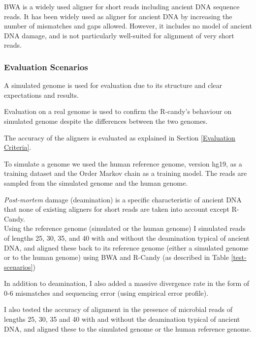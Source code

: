 \documentclass[11pt,a4paper]{report}
\begin{document}
BWA is a widely used aligner for short reads including ancient
DNA sequence reads.
It has been widely used as aligner for ancient DNA by increasing 
the number of mismatches and gaps allowed.  
However, it includes no model of ancient DNA damage, and is not 
particularly well-suited for alignment of very short reads.




\subsubsection{Evaluation Scenarios} \label{Evaluation Scenarios}

A simulated genome is used for evaluation due to its structure and
clear expectations and results. 

Evaluation on a real genome is used to 
confirm the R-candy's behaviour on simulated genome despite the 
differences between the two genomes.

The accuracy of the aligners is evaluated as explained in Section
 \ref{Evaluation Criteria}.

To simulate a genome we used the human reference genome, version hg19,
as a training dataset and the  Order Markov chain as a training 
model. The reads are sampled from the simulated genome and the human genome. 

\emph{Post-mortem} damage (deamination) is a specific characteristic of ancient 
DNA that none of existing aligners for short reads are taken into account except 
R-Candy.\\

Using the reference genome (simulated or the human genome) I simulated 
reads of lengths 25, 30, 35, and 40 with and without the deamination 
typical of ancient DNA, and aligned these back to its reference genome
(either a simulated genome or to the human genome) using BWA and R-Candy (as 
described in Table \ref{test-scenarios})

In addition to deamination, I also added a massive divergence rate in
the form of 0-6 mismatches and sequencing error (using empirical error profile).  

I also tested the accuracy of alignment in the presence of microbial reads of 
lengths 25, 30, 35 and 40 with and without the deamination typical of ancient DNA, 
and aligned these to the simulated genome or the human reference genome.
\end{document}
